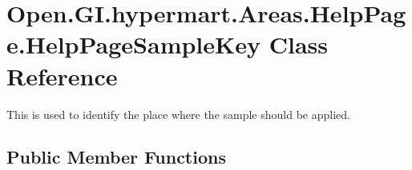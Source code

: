 \hypertarget{class_open_1_1_g_i_1_1hypermart_1_1_areas_1_1_help_page_1_1_help_page_sample_key}{}\section{Open.\+G\+I.\+hypermart.\+Areas.\+Help\+Page.\+Help\+Page\+Sample\+Key Class Reference}
\label{class_open_1_1_g_i_1_1hypermart_1_1_areas_1_1_help_page_1_1_help_page_sample_key}


This is used to identify the place where the sample should be applied.  


\subsection*{Public Member Functions}
